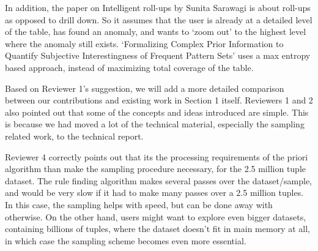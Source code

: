 \documentclass{article}
\begin{document}
In addition, the paper on Intelligent roll-ups by Sunita Sarawagi is about roll-ups as opposed to drill down. So it assumes that the user is already at a detailed level of the table, has found an anomaly, and wants to `zoom out' to the highest level where the anomaly still exists. `Formalizing Complex Prior Information to Quantify Subjective Interestingness of Frequent Pattern Sets' uses a max entropy based approach, instead of maximizing total coverage of the table. 

Based on Reviewer 1's suggestion, we will add a more detailed comparison between our contributions and existing work in Section 1 itself. Reviewers 1 and 2 also pointed out that some of the concepts and ideas introduced are simple. This is because we had moved a lot of the technical material, especially the sampling related work, to the technical report. 

Reviewer 4 correctly points out that its the processing requirements of the priori algorithm than make the sampling procedure necessary, for the 2.5 million tuple dataset. The rule finding algorithm makes several passes over the dataset/sample, and would be very slow if it had to make many passes over a 2.5 million tuples. In this case, the sampling helps with speed, but can be done away with otherwise. On the other hand, users might want to explore even bigger datasets, containing billions of tuples, where the dataset doesn't fit in main memory at all, in which case the sampling scheme becomes even more essential. 
\end{document}
